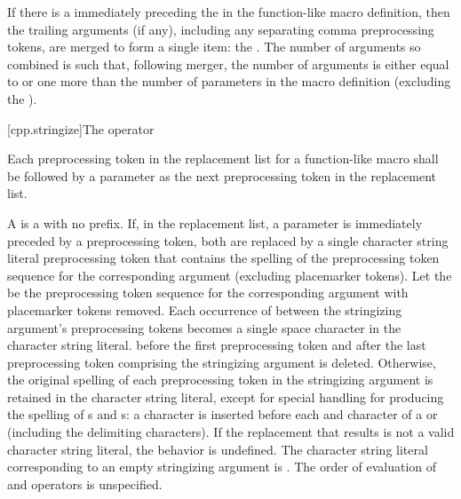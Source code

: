 \documentclass{wg21}
\newcommand{\cwhitespace}[1]{\removed{#1} \added{\grammarterm{whitespace}}}
\begin{document}
\pnum
{}%
If there is a  immediately preceding the \tcode{)} in the
function-like macro
definition, then the trailing arguments (if any), including any separating comma preprocessing
tokens, are merged to form a single item: the . The number of
arguments so combined is such that, following merger, the number of arguments is
either equal to or
one more than the number of parameters in the macro definition (excluding the
).

[cpp.stringize]{The \tcode{\#} operator}%
%

\pnum
Each
\tcode{\#}
preprocessing token in the replacement list for a function-like
macro shall be followed by a parameter as the next preprocessing
token in the replacement list.

\pnum
A  is a  with no prefix.
If, in the replacement list, a parameter is immediately
preceded by a
\tcode{\#}
preprocessing token,
both are replaced by a single character string literal preprocessing token that
contains the spelling of the preprocessing token sequence for the
corresponding argument (excluding placemarker tokens).
Let the  be the preprocessing token sequence
for the corresponding argument with placemarker tokens removed.
Each occurrence of \cwhitespace{whitespace} between the stringizing argument's preprocessing
tokens becomes a single space character in the character string literal.
 \cwhitespace{Whitespace} before the first preprocessing token and after the last
preprocessing token comprising the stringizing argument is deleted.
Otherwise, the original spelling of each preprocessing token in the
stringizing argument is retained in the character string literal,
except for special handling for producing the spelling of
s and s:
a
\tcode{\textbackslash}
character is inserted before each
and
\tcode{\textbackslash}
character of a  or 
(including the delimiting
characters).
If the replacement that results is not a valid character string literal,
the behavior is undefined. The character string literal corresponding to
an empty stringizing argument is .
The order of evaluation of
\tcode{\#}
and
\tcode{\#\#}
operators is unspecified.
\end{document}
